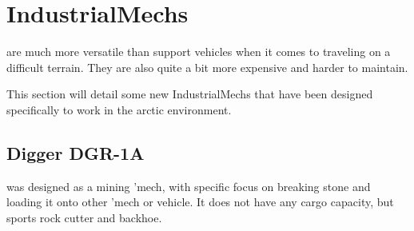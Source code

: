 \documentclass{tufte-book}
\begin{document}
\chapter{IndustrialMechs}
\label{ch:industrialmechs}


 are much more versatile than support vehicles
when it comes to traveling on a difficult terrain. They are also quite
a bit more expensive and harder to maintain.

This section will detail some new IndustrialMechs that have been
designed specifically to work in the arctic environment.


\section{Digger DGR-1A}
 was designed as a mining 'mech, with specific focus
on breaking stone and loading it onto other 'mech or vehicle. It does not
have any cargo capacity, but sports rock cutter and backhoe.

\end{document}

